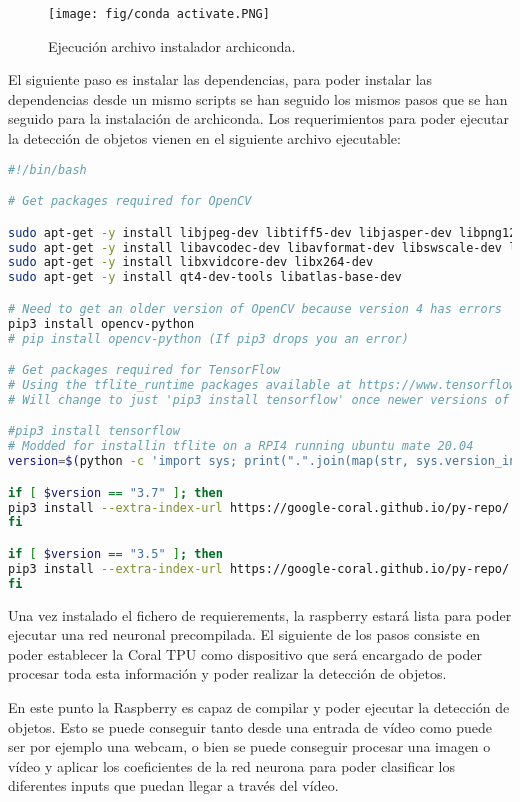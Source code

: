 \begin{figure}[h]
    \centering
    \texttt{[image: fig/conda activate.PNG]}
    \caption{Ejecución archivo instalador archiconda.}
    \label{fig:mesh1}
\end{figure}

El siguiente paso es instalar las dependencias, para poder instalar las dependencias desde un mismo scripts se han seguido los mismos pasos que se han seguido para la instalación de archiconda. Los requerimientos para poder ejecutar la detección de objetos vienen en el siguiente archivo ejecutable:

\begin{lstlisting}[language=bash, caption={Código bash}, label={cod:bash}, captionpos=b]
#!/bin/bash

# Get packages required for OpenCV

sudo apt-get -y install libjpeg-dev libtiff5-dev libjasper-dev libpng12-dev
sudo apt-get -y install libavcodec-dev libavformat-dev libswscale-dev libv4l-dev
sudo apt-get -y install libxvidcore-dev libx264-dev
sudo apt-get -y install qt4-dev-tools libatlas-base-dev

# Need to get an older version of OpenCV because version 4 has errors
pip3 install opencv-python
# pip install opencv-python (If pip3 drops you an error)

# Get packages required for TensorFlow
# Using the tflite_runtime packages available at https://www.tensorflow.org/lite/guide/python
# Will change to just 'pip3 install tensorflow' once newer versions of TF are added to piwheels

#pip3 install tensorflow
# Modded for installin tflite on a RPI4 running ubuntu mate 20.04
version=$(python -c 'import sys; print(".".join(map(str, sys.version_info[:2])))')

if [ $version == "3.7" ]; then
pip3 install --extra-index-url https://google-coral.github.io/py-repo/ tflite_runtime
fi

if [ $version == "3.5" ]; then
pip3 install --extra-index-url https://google-coral.github.io/py-repo/ tflite_runtime
fi
\end{lstlisting}

Una vez instalado el fichero de requierements, la raspberry estará lista para poder ejecutar una red neuronal precompilada. El siguiente de los pasos consiste en poder establecer la Coral TPU como dispositivo que será encargado de poder procesar toda esta información y poder realizar la detección de objetos.

En este punto la Raspberry es capaz de compilar y poder ejecutar la detección de objetos. Esto se puede conseguir tanto desde una entrada de vídeo como puede ser por ejemplo una webcam, o bien se puede conseguir procesar una imagen o vídeo y aplicar los coeficientes de la red neurona para poder clasificar los diferentes inputs que puedan llegar a través del vídeo. 

